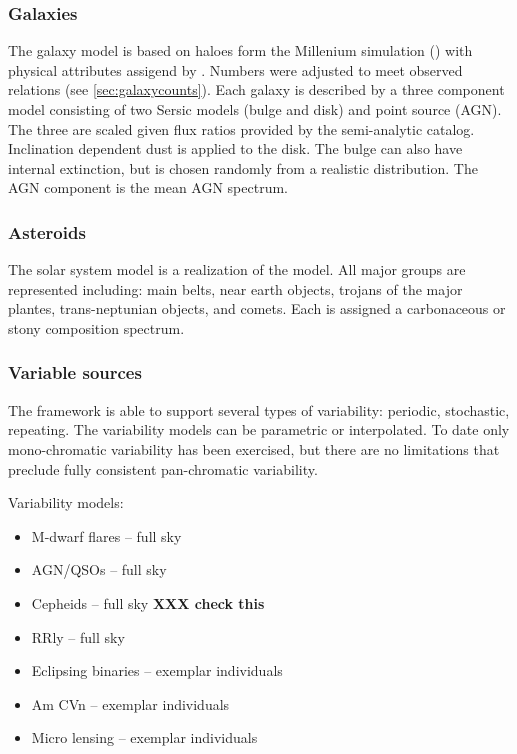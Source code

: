 \documentclass[]{article}
\begin{document}
\subsubsection{Galaxies}
The galaxy model is based on haloes form the Millenium simulation (\cite{millenium}) with physical attributes assigend by \cite{dilucia}.  
Numbers were adjusted to meet observed relations (see \ref{sec:galaxycounts}).  Each galaxy is described by a three component model consisting 
of two Sersic models (bulge and disk) and point source (AGN).  The three are scaled given flux ratios provided by the semi-analytic catalog.  Inclination dependent
dust is applied to the disk.  The bulge can also have internal extinction, but is chosen randomly from a realistic distribution.  The
AGN component is the \cite{vandenberk} mean AGN spectrum.

\subsubsection{Asteroids}
The solar system model is a realization of the \cite{grav} model.  All major groups are represented including: main belts, near earth objects, 
trojans of the major plantes, trans-neptunian objects, and comets.  Each is assigned a carbonaceous or stony composition spectrum.

\subsubsection{Variable sources}
The framework is able to support several types of variability: periodic, stochastic, repeating.  The variability models can be parametric or interpolated.  
To date only mono-chromatic variability has been exercised, but there are no limitations that preclude fully consistent pan-chromatic variability.

Variability models:
\begin{itemize}
\item M-dwarf flares -- full sky
\item AGN/QSOs -- full sky
\item Cepheids -- full sky {\bf XXX check this}
\item RRly -- full sky
\item Eclipsing binaries -- exemplar individuals
\item Am CVn -- exemplar individuals
\item Micro lensing -- exemplar individuals
\end{itemize}
\end{document}
